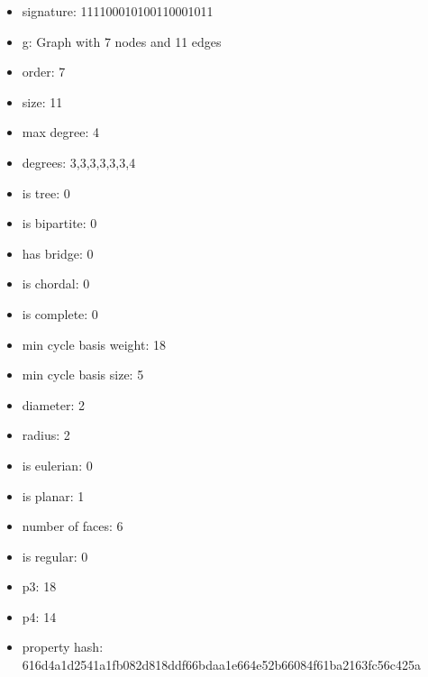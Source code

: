 \begin{itemize}
\item signature: 111100010100110001011
\item g: Graph with 7 nodes and 11 edges
\item order: 7
\item size: 11
\item max degree: 4
\item degrees: 3,3,3,3,3,3,4
\item is tree: 0
\item is bipartite: 0
\item has bridge: 0
\item is chordal: 0
\item is complete: 0
\item min cycle basis weight: 18
\item min cycle basis size: 5
\item diameter: 2
\item radius: 2
\item is eulerian: 0
\item is planar: 1
\item number of faces: 6
\item is regular: 0
\item p3: 18
\item p4: 14
\item property hash: 616d4a1d2541a1fb082d818ddf66bdaa1e664e52b66084f61ba2163fc56c425a
\end{itemize}
\newpage
\begin{figure}
\end{figure}
